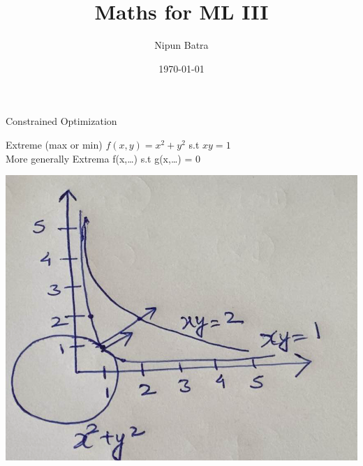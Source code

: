 \documentclass{beamer}
\title{Maths for ML III}
\date{\today}
\author{Nipun Batra}
\institute{IIT Gandhinagar}
\begin{document}
  \maketitle
  
  
  



    
    
    
    
    
    


\begin{frame}{Constrained Optimization}

Extreme (max or min) $f(x,y) = x^{2}+y^{2}$ s.t $xy=1$\\

\vspace{2em}
More generally Extrema f(x,\dots) s.t g(x,\dots) = 0
\pause \begin{center}
	\includegraphics[totalheight=6cm]{constrained.png}
\end{center}



\end{frame}
\end{document}

